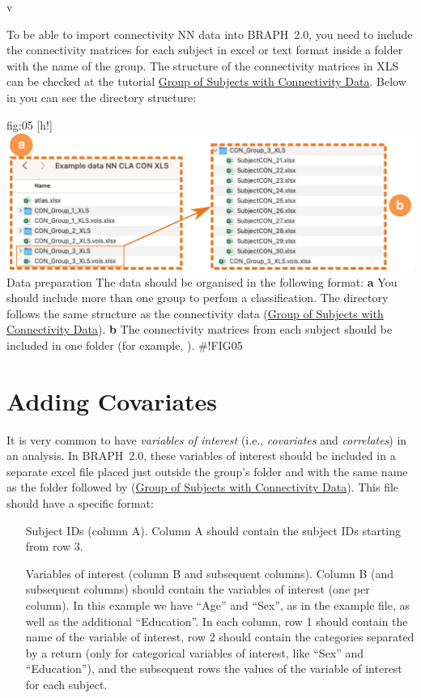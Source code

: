 v\documentclass[justified]{tufte-handout}
\begin{document}
To be able to import connectivity NN data into BRAPH~2.0, you need to include the connectivity matrices for each subject in excel or text format inside a folder with the name of the group. The structure of the connectivity matrices in XLS can be checked at the tutorial \href{https://github.com/braph-software/BRAPH-2/tree/develop/tutorials/general/tut_gr_con}{Group of Subjects with Connectivity Data}. Below in  you can see the directory structure:

	{fig:05}
	{
	[h!]
	\includegraphics{fig05.jpg}
	}
	{Data preparation}
	{
	The data should be organised in the following format:
	{\bf a} You should include more than one group to perfom a classification. The directory follows the same structure as the connectivity data (\href{https://github.com/braph-software/BRAPH-2/tree/develop/tutorials/general/tut_gr_con}{Group of Subjects with Connectivity Data}). 
	{\bf b} The connectivity matrices from each subject should be included in one folder (for example, ). 
	} 
#!FIG05

\section{Adding Covariates}

It is very common to have \emph{variables of interest} (i.e., \emph{covariates} and \emph{correlates}) in an analysis. In BRAPH~2.0, these variables of interest should be included in a separate excel file placed just outside the group's folder and with the same name as the folder followed by  (\href{https://github.com/braph-software/BRAPH-2/tree/develop/tutorials/general/tut_gr_con}{Group of Subjects with Connectivity Data}).
This file should have a specific format:
\begin{itemize}

\item[Subject IDs (column A).]
Column A should contain the subject IDs starting from row 3.

\item[Variables of interest (column B and subsequent columns).]
Column B (and subsequent columns) should contain the variables of interest (one per column). 
In this example we have ``Age'' and ``Sex'', as in the example file, as well as the additional ``Education''.
In each column, row 1 should contain the name of the variable of interest, row 2 should contain the categories separated by a return (only for categorical variables of interest, like ``Sex'' and ``Education''), and the subsequent rows the values of the variable of interest for each subject.

\end{itemize}	
\end{document}
